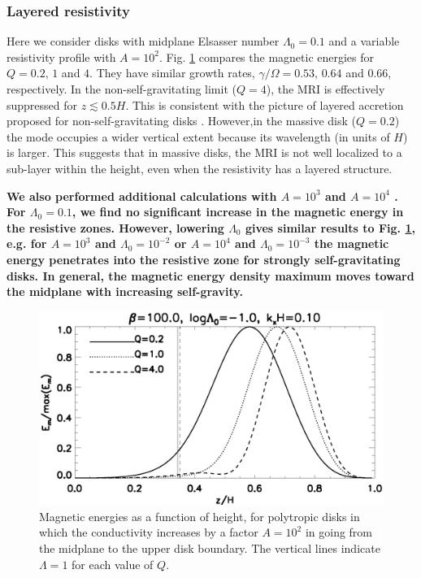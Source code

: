 \subsubsection{Layered 
  resistivity} 
Here we consider disks with midplane Elsasser number $\Lambda_0=0.1$
and a variable resistivity profile with
$A=10^2$. Fig. \ref{poly_layer} compares the magnetic  
energies for $Q=0.2,\,1$ and $4$. They have similar growth rates, $\gamma/\Omega
= 0.53,\,0.64$ and $0.66$, respectively. In the non-self-gravitating
limit ($Q=4$), the MRI is effectively suppressed for
$z\lesssim0.5H$. This is consistent with the picture of layered
accretion proposed for non-self-gravitating disks \citep{gammie96,fleming03}. 
However,in the massive disk ($Q=0.2$) the mode occupies a wider vertical
extent because its wavelength (in units of $H$) is larger. This
suggests that in massive disks, the MRI is not well localized to a
sub-layer within the height, even when the resistivity has a layered
structure. 

{\bf 
We also performed additional calculations with $A=10^3$ and $A=10^4$
\citep[see Fig. 1 of ][]{gressel12}. For $\Lambda_0=0.1$, we find no
significant increase in the magnetic energy in the resistive zones. 
However, lowering $\Lambda_0$ gives similar
results to Fig. \ref{poly_layer}, e.g. for $A=10^3$ and
$\Lambda_0=10^{-2}$ or $A=10^4$ and $\Lambda_0=10^{-3}$ the magnetic
energy penetrates into the resistive zone for strongly
self-gravitating disks. In general, the magnetic energy density maximum moves
toward the midplane with increasing self-gravity.    
}

\begin{figure}
  \includegraphics[width=\linewidth]{figures/compare_results_poly_layer_amp100}
  \caption{Magnetic energies as a function of height, for polytropic disks
    in which the conductivity increases by a
    factor $A=10^2$ in going from the midplane to the upper disk
    boundary. The vertical lines indicate $\Lambda=1$ for each value 
    of $Q$.
    \label{poly_layer}}
\end{figure}

